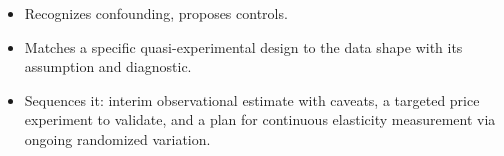\begin{interviewq}

\goodgreat
\begin{itemize}
    \item {} Recognizes confounding, proposes controls.
    \item {} Matches a specific quasi-experimental design to the data shape with its assumption and diagnostic.
    \item {} Sequences it: interim observational estimate with caveats, a targeted price experiment to validate, and a plan for continuous elasticity measurement via ongoing randomized variation.
\end{itemize}

\end{interviewq}

